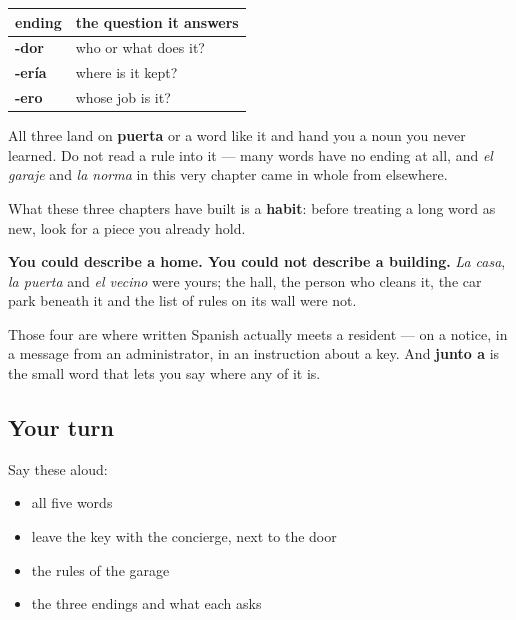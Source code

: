 \begin{grammarlens}[title={Grammar Lens: three endings, three questions}]
\noindent
\begin{tabularx}{\linewidth}{@{}>{\raggedright\arraybackslash}X>{\raggedright\arraybackslash}X@{}}
\toprule
\textbf{ending} & \textbf{the question it answers} \\
\midrule
\textbf{-dor} & who or what does it? \\
\textbf{-ería} & where is it kept? \\
\textbf{-ero} & whose job is it? \\
\bottomrule
\end{tabularx}

All three land on \textbf{puerta} or a word like it and hand you a noun you never learned. Do not read a rule into it — many words have no ending at all, and \emph{el garaje} and \emph{la norma} in this very chapter came in whole from elsewhere.

What these three chapters have built is a \textbf{habit}: before treating a long word as new, look for a piece you already hold.
\end{grammarlens}

\begin{grammarlens}[title={What you've built}]
\textbf{You could describe a home. You could not describe a building.} \emph{La casa}, \emph{la puerta} and \emph{el vecino} were yours; the hall, the person who cleans it, the car park beneath it and the list of rules on its wall were not.

Those four are where written Spanish actually meets a resident — on a notice, in a message from an administrator, in an instruction about a key. And \textbf{junto a} is the small word that lets you say where any of it is.
\end{grammarlens}

\subsection*{Your turn}
Say these aloud:

\begin{itemize}
\raggedright
  \item all five words
  \item leave the key with the concierge, next to the door
  \item the rules of the garage
  \item the three endings and what each asks
\end{itemize}

